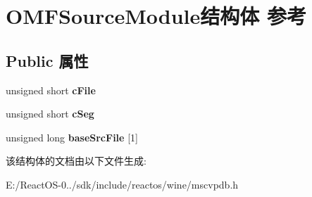 \hypertarget{struct_o_m_f_source_module}{}\section{O\+M\+F\+Source\+Module结构体 参考}
\label{struct_o_m_f_source_module}
\subsection*{Public 属性}
\begin{DoxyCompactItemize}
\item 
\mbox{\label{struct_o_m_f_source_module_a9cb4e5d956af37e2e63098e5a0e98e16}} 
unsigned short {\bfseries c\+File}
\item 
\mbox{\label{struct_o_m_f_source_module_aa39652d6a19a3efa0632689f1795e7f1}} 
unsigned short {\bfseries c\+Seg}
\item 
\mbox{\label{struct_o_m_f_source_module_a9813bb1b6b34ad6af26523eb1b1e6801}} 
unsigned long {\bfseries base\+Src\+File} \mbox{[}1\mbox{]}
\end{DoxyCompactItemize}


该结构体的文档由以下文件生成\+:\begin{DoxyCompactItemize}
\item 
E\+:/\+React\+O\+S-\/0../sdk/include/reactos/wine/mscvpdb.\+h\end{DoxyCompactItemize}
